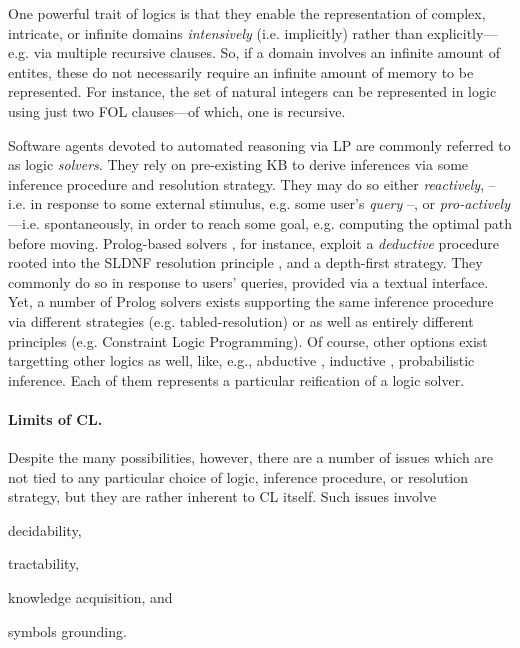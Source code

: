 \documentclass[12pt,a4paper,openright,twoside]{book}
\begin{document}
One powerful trait of logics is that they enable the representation of complex, intricate, or infinite domains \emph{intensively} (i.e. implicitly) rather than explicitly---e.g. via multiple recursive clauses.
%
So, if a domain involves an infinite amount of entites, these do not necessarily require an infinite amount of memory to be represented.
%
For instance, the set of natural integers can be represented in logic using just two FOL clauses---of which, one is recursive.

Software agents devoted to automated reasoning via LP are commonly referred to as logic \emph{solvers}.
%
They rely on pre-existing KB to derive inferences via some inference procedure and resolution strategy.
%
They may do so either \emph{reactively}, -- i.e. in response to some external stimulus, e.g. some user's \emph{query} --, or \emph{pro-actively}---i.e. spontaneously, in order to reach some goal, e.g. computing the optimal path before moving. 
%
Prolog-based solvers \cite{ColmerauerR93,colmerauer1986-theoreticalProlog}, for instance, exploit a \emph{deductive} procedure rooted into the SLDNF resolution principle \cite{Kowalski1974, Clark77}, and a depth-first strategy.
%
They commonly do so in response to users' queries, provided via a textual interface.
%
Yet, a number of Prolog solvers exists supporting the same inference procedure via different strategies (e.g. tabled-resolution\missingref) or as well as entirely different principles (e.g. Constraint Logic Programming). 
%
Of course, other options exist targetting other logics as well, like, e.g., abductive \cite{FungIff97}, inductive \cite{Muggleton94}, probabilistic \cite{RaedtK15} inference.
%
Each of them represents a particular reification of a logic solver.

\paragraph{Limits of CL.}

Despite the many possibilities, however, there are a number of issues which are not tied to any particular choice of logic, inference procedure, or resolution strategy, but they are rather inherent to CL itself.
%
Such issues involve
%
\begin{inlinelist}
    \item decidability,
    \item tractability,
    \item knowledge acquisition, and
    \item symbols grounding.
\end{inlinelist}
\end{document}
